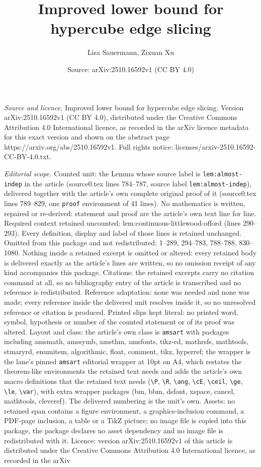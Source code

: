 \documentclass[10pt,a4paper]{amsart}
\title[Improved lower bound for hypercube edge slicing]{Improved lower bound for hypercube edge slicing}
\author{Lisa Sauermann, Zixuan Xu}
\date{Source: arXiv:2510.16592v1 (CC BY 4.0)}
\begin{document}
\maketitle

\noindent\emph{Source and licence.} Improved lower bound for hypercube edge slicing. Version arXiv:2510.16592v1 (CC BY 4.0), distributed under the Creative Commons Attribution 4.0 International licence, as recorded in the arXiv licence metadata for this exact version and shown on the abstract page https://arxiv.org/abs/2510.16592v1. Full rights notice: licenses/arxiv-2510.16592-CC-BY-4.0.txt.\par\smallskip

\noindent\textit{Editorial scope.} Counted unit: the Lemma whose source label is \texttt{lem:almost-indep} in the article (source0.tex lines 784--787, source label \texttt{lem:almost-indep}), delivered together with the article's own complete original proof of it (source0.tex lines 789--829, one \texttt{proof} environment of 41 lines). No mathematics is written, repaired or re-derived: statement and proof are the article's own text line for line. Required context retained uncounted: lem:continuous-littlewood-offord (lines 290--293). Every definition, display and label of those lines is retained unchanged. Omitted from this package and not redistributed: 1--289, 294--783, 788--788, 830--1080. Nothing inside a retained excerpt is omitted or altered: every retained body is delivered exactly as the article's lines are written, so no omission receipt of any kind accompanies this package. Citations: the retained excerpts carry no citation command at all, so no bibliography entry of the article is transcribed and no reference is redistributed. Reference adaptation: none was needed and none was made; every reference inside the delivered unit resolves inside it, so no unresolved reference or citation is produced. Printed slips kept literal: no printed word, symbol, hypothesis or number of the counted statement or of its proof was altered. Layout and class: the article's own class is \texttt{amsart} with packages including amsmath, amssymb, amsthm, amsfonts, tikz-cd, mathrsfs, mathtools, stmaryrd, enumitem, algorithmic, float, comment, tikz, hyperref; the wrapper is the lane's pinned \texttt{amsart} editorial wrapper at 10pt on A4, which restates the theorem-like environments the retained text needs and adds the article's own macro definitions that the retained text needs (\texttt{\textbackslash P}, \texttt{\textbackslash R}, \texttt{\textbackslash ang}, \texttt{\textbackslash cE}, \texttt{\textbackslash ceil}, \texttt{\textbackslash ge}, \texttt{\textbackslash le}, \texttt{\textbackslash var}), with extra wrapper packages (bm, bbm, dsfont, xspace, cancel, mathtools, cleveref). The delivered numbering is the unit's own. Assets: no retained span contains a figure environment, a graphics-inclusion command, a PDF-page inclusion, a table or a TikZ picture; no image file is copied into this package, the package declares no asset dependency and no image file is redistributed with it. Licence: version arXiv:2510.16592v1 of this article is distributed under the Creative Commons Attribution 4.0 International licence, as recorded in the arXiv 
\end{document}
